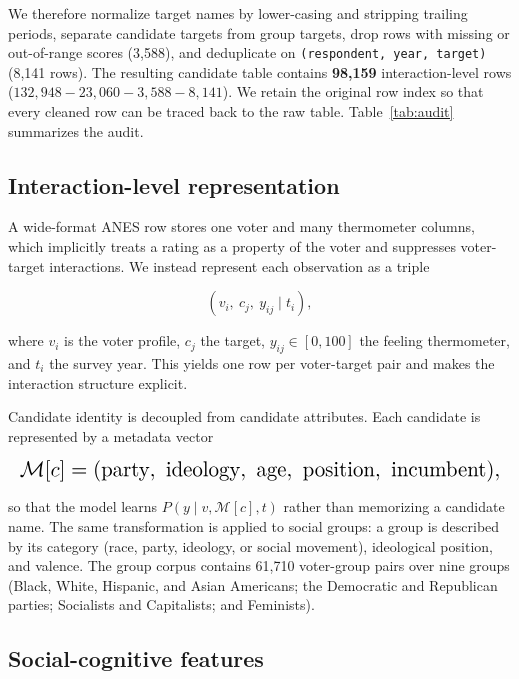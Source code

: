 We therefore normalize target names by lower-casing and stripping
trailing periods, separate candidate targets from group targets, drop
rows with missing or out-of-range scores (3,588), and deduplicate on
\texttt{(respondent,\ year,\ target)} (8,141 rows). The resulting
candidate table contains \textbf{98,159} interaction-level rows
(\(132{,}948 - 23{,}060 - 3{,}588 - 8{,}141\)). We retain the original
row index so that every cleaned row can be traced back to the raw table.
Table~\ref{tab:audit} summarizes the audit.



\subsection{Interaction-level
representation}\label{interaction-level-representation}

A wide-format ANES row stores one voter and many thermometer columns,
which implicitly treats a rating as a property of the voter and
suppresses voter-target interactions. We instead represent each
observation as a triple

\[
(v_i,\ c_j,\ y_{ij}\mid t_i),
\]

where \(v_i\) is the voter profile, \(c_j\) the target,
\(y_{ij}\in[0,100]\) the feeling thermometer, and \(t_i\) the survey
year. This yields one row per voter-target pair and makes the
interaction structure explicit.

Candidate identity is decoupled from candidate attributes. Each
candidate is represented by a metadata vector

\begin{equation*}
\resizebox{\columnwidth}{!}{$\displaystyle 
\mathcal{M}[c] = (\text{party},\ \text{ideology},\ \text{age},\ \text{position},\ \text{incumbent}),
$}
\end{equation*}

so that the model learns \(P(y\mid v,\mathcal{M}[c],t)\) rather than
memorizing a candidate name. The same transformation is applied to
social groups: a group is described by its category (race, party,
ideology, or social movement), ideological position, and valence. The
group corpus contains 61,710 voter-group pairs over nine groups (Black,
White, Hispanic, and Asian Americans; the Democratic and Republican
parties; Socialists and Capitalists; and Feminists).

\subsection{Social-cognitive features}\label{social-cognitive-features}

